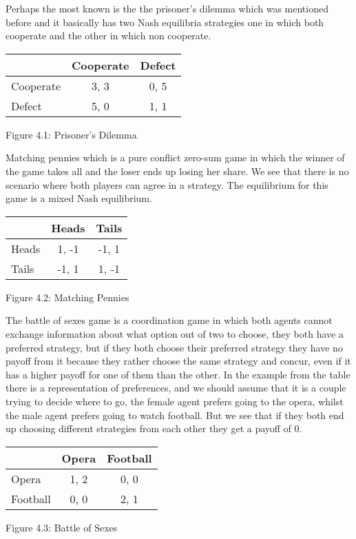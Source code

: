 \documentclass{article}
\begin{document}
Perhaps the most known is the the prisoner's dilemma which was mentioned before and it basically has two Nash equilibria strategies one in which both cooperate and the other in which non cooperate.
\begin{center}
\begin{tabular}{|l|c|c|}
\hline
 & Cooperate & Defect \\ 
\hline
Cooperate & 3, 3 & 0, 5\\
\hline
 Defect & 5, 0 & 1, 1\\
\hline
\end{tabular}
\end{center}
\begin{center}
	Figure 4.1: Prisoner's Dilemma
\end{center}


Matching pennies which is a pure conflict zero-sum game in which the winner of the game takes all and the loser ends up losing her share. We see that there is no scenario where both players can agree in a strategy. The equilibrium for this game is a mixed Nash equilibrium.
\begin{center}
\begin{tabular}{|l|c|c|}
\hline
 & Heads & Tails \\ 
\hline
Heads & 1, -1 & -1, 1\\
\hline
 Tails & -1, 1 & 1, -1\\
\hline
\end{tabular}
\end{center}
\begin{center}
	Figure 4.2: Matching Pennies
\end{center}


The battle of sexes game is a coordination game in which both agents cannot exchange information about what option out of two to choose, they both have a preferred strategy, but if they both choose their preferred strategy they have no payoff from it because they rather choose the same strategy and concur,  even if it has a higher payoff for one of them than the other. In the example from the table there is a representation of preferences, and we should assume that it is a couple trying to decide where to go, the female agent prefers going to the opera, whilst the male agent prefers going to watch football. But we see that if they both end up choosing different strategies from each other they get a payoff of 0. 
\begin{center}
\begin{tabular}{|l|c|c|}
\hline
 & Opera & Football \\ 
\hline
Opera & 1, 2 & 0, 0\\
\hline
 Football & 0, 0 & 2, 1\\
\hline
\end{tabular}
\end{center}
\begin{center}
	Figure 4.3: Battle of Sexes
\end{center}
\end{document}
